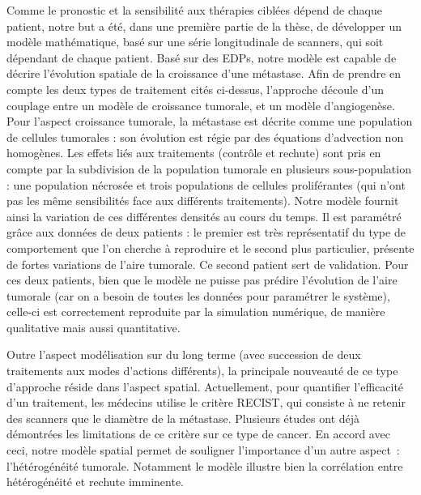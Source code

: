 \documentclass[12pt,a4paper]{article}
\newcommand{\hetero}{hétérogénéité\xspace}
\begin{document}
Comme le pronostic et la sensibilité aux thérapies ciblées dépend de chaque patient, notre but a été, dans une première partie de la thèse, de développer un modèle mathématique, basé sur une série longitudinale de scanners, %
qui soit dépendant de chaque patient. 
Basé sur des EDPs, notre modèle est capable de décrire l'évolution spatiale de la croissance d'une métastase. 
Afin de prendre en compte les deux types de traitement cités ci-dessus, l'approche découle d'un couplage entre un modèle de croissance tumorale, et un modèle d'angiogenèse. 
Pour l'aspect croissance tumorale, la métastase est décrite comme une population de cellules tumorales %
: son évolution est régie par des équations d'advection non homogènes. 
Les effets liés aux traitements (contrôle et rechute) sont pris en compte par la subdivision de la population tumorale en plusieurs sous-population : une population nécrosée et trois populations de cellules proliférantes (qui n'ont pas les même sensibilités face aux différents traitements). 
Notre modèle fournit ainsi la variation de ces différentes densités au cours du temps. 
Il %
est paramétré grâce %
aux données de deux patients : le premier est très représentatif du type de comportement que l'on cherche à reproduire et le second plus particulier, présente de  fortes variations de l'aire tumorale.  
Ce second patient sert de validation. 
Pour ces deux patients, bien que le modèle ne puisse pas prédire l'évolution de l'aire tumorale (car on a besoin de toutes les données pour paramétrer le système), celle-ci est correctement reproduite par la simulation numérique, de manière qualitative mais aussi quantitative.



Outre l'aspect modélisation sur du long terme (avec succession de deux traitements aux modes d'actions différents), la principale nouveauté de ce type d'approche réside dans l'aspect spatial. Actuellement, pour quantifier l'efficacité d'un traitement, les médecins utilise le critère RECIST, qui consiste à ne retenir des scanners que le diamètre de la métastase. Plusieurs études ont déjà démontrées les limitations de ce critère sur ce type de cancer. En accord avec ceci, notre modèle spatial permet de souligner l'importance d'un autre aspect~: l'\hetero tumorale. Notamment le modèle illustre bien la corrélation entre \hetero et rechute imminente.
\end{document}

